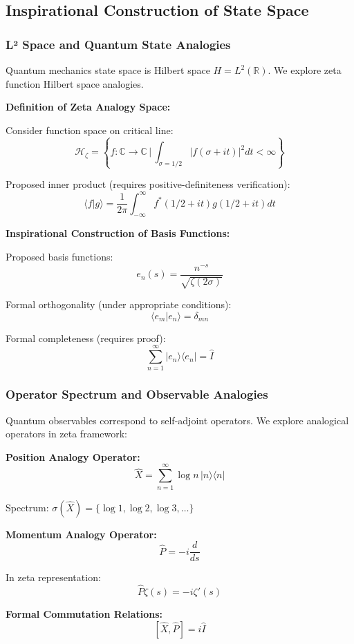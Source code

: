 \documentclass[11pt]{article}
\theoremstyle{plain}
\theoremstyle{definition}
\theoremstyle{remark}
\begin{document}
\subsection{Inspirational Construction of State Space}

\subsubsection{L² Space and Quantum State Analogies}

Quantum mechanics state space is Hilbert space $H = L^2(\mathbb{R})$. We explore zeta function Hilbert space analogies.

\textbf{Definition of Zeta Analogy Space:}

Consider function space on critical line:
$$\mathcal{H}_\zeta = \left\{ f: \mathbb{C} \to \mathbb{C} \,\bigg|\, \int_{\sigma=1/2} |f(\sigma + it)|^2 dt < \infty \right\}$$

Proposed inner product (requires positive-definiteness verification):
$$\langle f|g \rangle = \frac{1}{2\pi} \int_{-\infty}^{\infty} f^*(1/2 + it) g(1/2 + it) dt$$

\textbf{Inspirational Construction of Basis Functions:}

Proposed basis functions:
$$e_n(s) = \frac{n^{-s}}{\sqrt{\zeta(2\sigma)}}$$

Formal orthogonality (under appropriate conditions):
$$\langle e_m | e_n \rangle = \delta_{mn}$$

Formal completeness (requires proof):
$$\sum_{n=1}^{\infty} |e_n\rangle\langle e_n| = \hat{I}$$

\subsubsection{Operator Spectrum and Observable Analogies}

Quantum observables correspond to self-adjoint operators. We explore analogical operators in zeta framework:

\textbf{Position Analogy Operator:}
$$\hat{X} = \sum_{n=1}^{\infty} \log n \, |n\rangle\langle n|$$

Spectrum: $\sigma(\hat{X}) = \{\log 1, \log 2, \log 3, \ldots\}$

\textbf{Momentum Analogy Operator:}
$$\hat{P} = -i \frac{d}{ds}$$

In zeta representation:
$$\hat{P} \zeta(s) = -i \zeta'(s)$$

\textbf{Formal Commutation Relations:}
$$[\hat{X}, \hat{P}] = i\hat{I}$$
\end{document}
